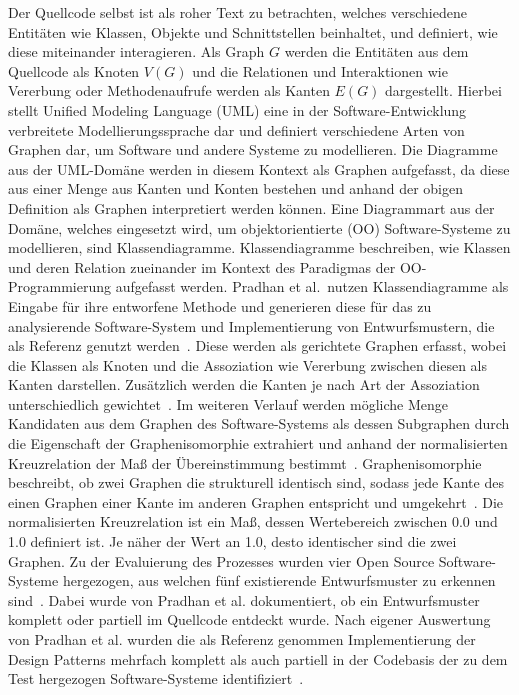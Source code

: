Der Quellcode selbst ist als roher Text zu betrachten, welches verschiedene Entitäten wie Klassen, Objekte und Schnittstellen beinhaltet, und definiert, wie diese miteinander interagieren. Als Graph $G$ werden die Entitäten aus dem Quellcode als Knoten $V (G)$ und 
die Relationen und Interaktionen wie Vererbung oder Methodenaufrufe werden als Kanten $E (G)$ dargestellt.
Hierbei stellt Unified Modeling Language (UML) eine in der Software-Entwicklung verbreitete Modellierungssprache dar und definiert verschiedene Arten von Graphen dar, um Software und andere Systeme zu modellieren.
Die Diagramme aus der UML-Domäne werden in diesem Kontext als Graphen aufgefasst, da diese aus einer Menge aus Kanten und Konten bestehen und anhand der obigen Definition als Graphen interpretiert werden können.
Eine Diagrammart aus der Domäne, welches eingesetzt wird, um objektorientierte (OO) Software-Systeme zu modellieren, sind Klassendiagramme.
Klassendiagramme beschreiben, wie Klassen und deren Relation zueinander im Kontext des Paradigmas der OO-Programmierung aufgefasst werden.
Pradhan et al.\ nutzen Klassendiagramme als Eingabe für ihre entworfene Methode und generieren diese für das zu analysierende Software-System und Implementierung von Entwurfsmustern, die als Referenz genutzt werden~\cite[S. 2]{7346680}.
Diese werden als gerichtete Graphen erfasst, wobei die Klassen als Knoten und die Assoziation wie Vererbung zwischen diesen als Kanten darstellen. Zusätzlich werden die Kanten je nach Art der Assoziation unterschiedlich gewichtet~\cite[S. 2]{7346680}.
Im weiteren Verlauf werden mögliche Menge Kandidaten aus dem Graphen des Software-Systems als dessen Subgraphen durch die Eigenschaft der Graphenisomorphie extrahiert und anhand der normalisierten Kreuzrelation der Maß der Übereinstimmung bestimmt~\cite[S. 3]{7346680}.
Graphenisomorphie beschreibt, ob zwei Graphen die strukturell identisch sind, sodass jede Kante des einen Graphen einer Kante im anderen Graphen entspricht und umgekehrt~\cite[S. 10]{Siu1998IntroductionTG}. Die normalisierten Kreuzrelation ist ein Maß, dessen Wertebereich zwischen 0.0 und 1.0 definiert ist.
Je näher der Wert an 1.0, desto identischer sind die zwei Graphen. 
Zu der Evaluierung des Prozesses wurden vier Open Source Software-Systeme hergezogen, aus welchen fünf existierende Entwurfsmuster zu erkennen sind~\cite[S. 6]{7346680}. Dabei wurde von Pradhan et al. dokumentiert, ob ein Entwurfsmuster komplett oder partiell im Quellcode entdeckt wurde.
Nach eigener Auswertung von Pradhan et al. wurden die als Referenz genommen Implementierung der Design Patterns mehrfach komplett als auch partiell in der Codebasis der zu dem Test hergezogen Software-Systeme identifiziert~\cite[S. 6]{7346680}.

